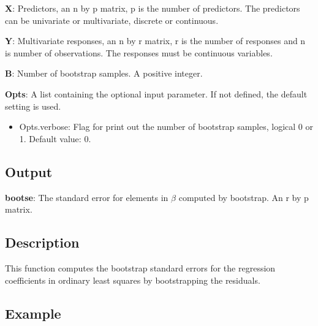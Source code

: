 \documentclass[a4paper,11pt,openany]{memoir}
\begin{document}
\begin{par}
\textbf{X}: Predictors, an n by p matrix, p is the number of predictors.  The predictors can be univariate or multivariate, discrete or continuous.
\end{par} \vspace{1em}
\begin{par}
\textbf{Y}: Multivariate responses, an n by r matrix, r is the number of responses and n is number of observations.  The responses must be continuous variables.
\end{par} \vspace{1em}
\begin{par}
\textbf{B}: Number of bootstrap samples.  A positive integer.
\end{par} \vspace{1em}
\begin{par}
\textbf{Opts}: A list containing the optional input parameter. If not defined, the default setting is used.
\end{par} \vspace{1em}
\begin{itemize}
\setlength{\itemsep}{-1ex}
   \item Opts.verbose: Flag for print out the number of bootstrap samples, logical 0 or 1. Default value: 0.
\end{itemize}


\subsection*{Output}

\begin{par}
\textbf{bootse}: The standard error for elements in $\beta$ computed by bootstrap.  An r by p matrix.
\end{par} \vspace{1em}


\subsection*{Description}

\begin{par}
This function computes the bootstrap standard errors for the regression coefficients in ordinary least squares by bootstrapping the residuals.
\end{par} \vspace{1em}


\subsection*{Example}
\end{document}
